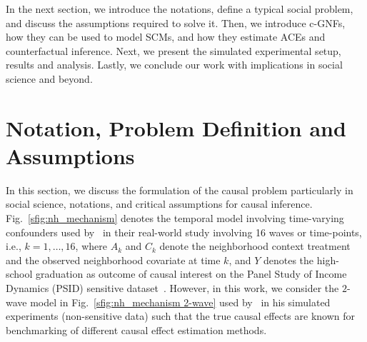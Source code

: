 \documentclass[letterpaper]{article} %
\begin{document}
In the next section, we introduce the notations, define a typical social problem, and discuss the assumptions required to solve it. Then, we introduce c-GNFs, how they can be used to model SCMs, and how they estimate ACEs and counterfactual inference. Next, we present the simulated experimental setup, results and analysis. %
Lastly, we conclude our work with implications in social science and beyond. 




\section{Notation, Problem Definition and Assumptions}\label{sec:problemdefinition,assumptions,notations}
In this section, we discuss the formulation of the causal problem particularly in social science, notations, and critical assumptions for causal inference.
Fig.~\ref{sfig:nh_mechanism} denotes the temporal model involving time-varying confounders used by~\citet{wodtke2011ipw} in their real-world study involving 16 waves or time-points, i.e., $k{ = }1, \ldots, 16$, where $A_k$ and $C_k$ denote the neighborhood context treatment and the observed neighborhood covariate at time $k$, and $Y$ denotes the high-school graduation as outcome of causal interest on the Panel Study of Income Dynamics (PSID) sensitive dataset~\cite{geolytics2003censuscdPSID}. 
However, in this work, we consider the $2$-wave model in Fig.~\ref{sfig:nh_mechanism 2-wave} used by~\citet{wodtke2020rwr} in his simulated experiments (non-sensitive data) such that the true causal effects are known for benchmarking of different causal effect estimation methods.
\end{document}
